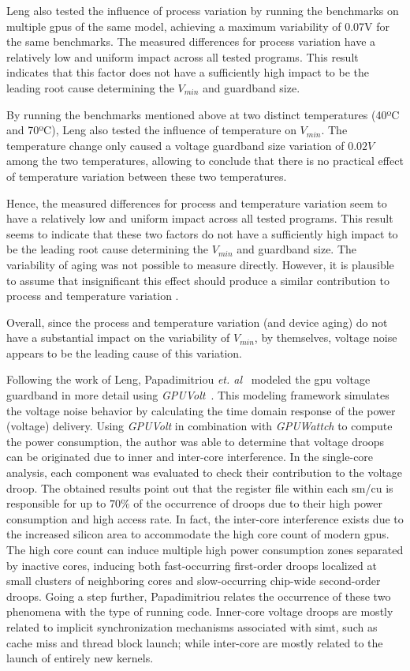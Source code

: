 Leng also tested the influence of process variation by running the benchmarks on multiple \acrshort{gpu}s of the same model, achieving a maximum variability of 0.07V for the same benchmarks. The measured differences for process variation have a relatively low and uniform impact across all tested programs. This result indicates that this factor does not have a sufficiently high impact to be the leading root cause determining the $V_{min}$ and guardband size.

By running the benchmarks mentioned above at two distinct temperatures (40ºC and 70ºC), Leng also tested the influence of temperature on $V_{min}$. The temperature change only caused a voltage guardband size variation of $0.02V$ among the two temperatures, allowing to conclude that there is no practical effect of temperature variation between these two temperatures.

Hence, the measured differences for process and temperature variation seem to have a relatively low and uniform impact across all tested programs. This result seems to indicate that these two factors do not have a sufficiently high impact to be the leading root cause determining the $V_{min}$ and guardband size.
The variability of aging was not possible to measure directly. However, it is plausible to assume that insignificant this effect should produce a similar contribution to process and temperature variation \cite{leng_safe_2015}.

Overall, since the process and temperature variation (and device aging) do not have a substantial impact on the variability of $V_{min}$, by themselves, voltage noise appears to be the leading cause of this variation.

Following the work of Leng, Papadimitriou \textit{et. al}~\cite{papadimitriou_exceeding_2020} modeled the \acrshort{gpu} voltage guardband in more detail using \textit{GPUVolt}~\cite{leng_gpuvolt_2014}. This modeling framework simulates the voltage noise behavior by calculating the time domain response of the power (voltage) delivery. Using \textit{GPUVolt} in combination with \textit{GPUWattch} to compute the power consumption, the author was able to determine that voltage droops can be originated due to inner and inter-core interference. In the single-core analysis, each component was evaluated to check their contribution to the voltage droop. The obtained results point out that the register file within each \acrshort{sm}/\acrshort{cu} is responsible for up to $70\%$ of the occurrence of droops due to their high power consumption and high access rate. In fact, the inter-core interference exists due to the increased silicon area to accommodate the high core count of modern \acrshort{gpu}s. The high core count can induce multiple high power consumption zones separated by inactive cores, inducing both fast-occurring first-order droops localized at small clusters of neighboring cores and slow-occurring chip-wide second-order droops. Going a step further, Papadimitriou relates the occurrence of these two phenomena with the type of running code. Inner-core voltage droops are mostly related to implicit synchronization mechanisms associated with \acrshort{simt}, such as cache miss and thread block launch; while inter-core are mostly related to the launch of entirely new kernels.

